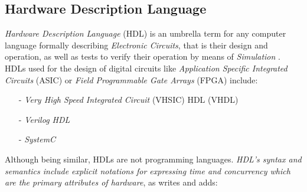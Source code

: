 %
%
%
%
%
%
%

\subsection{Hardware Description Language}
\label{hardware_description_language_heading}

\emph{Hardware Description Language} (HDL) is an umbrella term for any computer
language formally describing \emph{Electronic Circuits}, that is their design and
operation, as well as tests to verify their operation by means of \emph{Simulation}
\cite{wikipedia}. HDLs used for the design of digital circuits like
\emph{Application Specific Integrated Circuits} (ASIC) or
\emph{Field Programmable Gate Arrays} (FPGA) include:

\begin{itemize}
    \item[-] \emph{Very High Speed Integrated Circuit} (VHSIC) HDL (VHDL) \cite[standard 1164]{ieee}
    \item[-] \emph{Verilog HDL} \cite[standard 1364-2001]{ieee}
    \item[-] \emph{SystemC} \cite{doulos}
\end{itemize}

Although being similar, HDLs are not programming languages. \textit{HDL's syntax
and semantics include explicit notations for expressing time and concurrency which
are the primary attributes of hardware}, as \cite{wikipedia} writes and adds:

